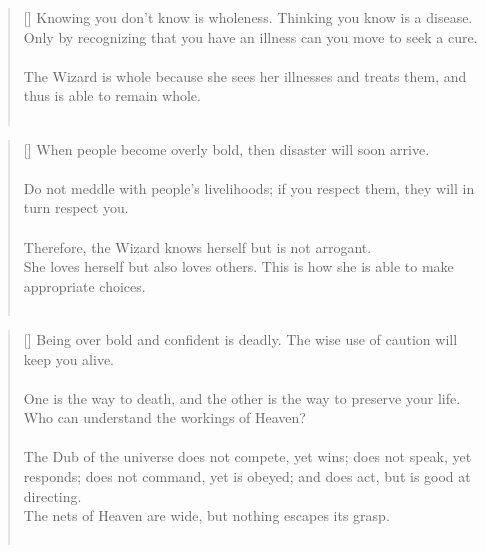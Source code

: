 \documentclass{article}
\begin{document}
\settowidth{\versewidth}{The Wizard leads byemptying people’s minds, filling their bellies, weakening their am- bitions, and making them become strong}
\begin{verse}[\versewidth]
Knowing you don't know is wholeness. 
Thinking you know is a disease.\\
Only by recognizing that you have an illness can you move to seek a cure.\\
\hfill\\
The Wizard is whole because she sees her illnesses and treats them, and thus is able to remain whole.\\
\hfill\\
\end{verse}

\settowidth{\versewidth}{The Wizard leads byemptying people’s minds, filling their bellies, weakening their am- bitions, and making them become strong}
\begin{verse}[\versewidth]
When people become overly bold, then disaster will soon arrive.\\
\hfill\\
Do not meddle with people's livelihoods; if you respect them, they will in turn respect you.\\
\hfill\\
Therefore, the Wizard knows herself but is not arrogant.\\
She loves herself but also loves others. 
This is how she is able to make appropriate choices.\\
\hfill\\
\end{verse}

\settowidth{\versewidth}{The Wizard leads byemptying people’s minds, filling their bellies, weakening their am- bitions, and making them become strong}
\begin{verse}[\versewidth]
Being over bold and confident is deadly. 
The wise use of caution will keep you alive.\\
\hfill\\
One is the way to death, and the other is the way to preserve your life. 
Who can understand the workings of Heaven?\\
\hfill\\
The Dub of the universe does not compete, yet wins; does not speak, yet responds; does not command, yet is obeyed; and does act, but is good at directing.\\
The nets of Heaven are wide, but nothing escapes its grasp.\\
\hfill\\
\end{verse}
\end{document}
